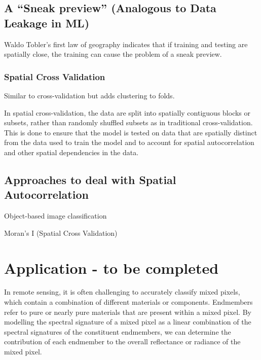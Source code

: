 \documentclass[
  letterpaper,
  DIV=11,
  numbers=noendperiod]{scrreprt}
\begin{document}
\hypertarget{a-sneak-preview-analogous-to-data-leakage-in-ml}{%
\subsection{A ``Sneak preview'' (Analogous to Data Leakage in
ML)}\label{a-sneak-preview-analogous-to-data-leakage-in-ml}}

Waldo Tobler's first law of geography indicates that if training and
testing are spatially close, the training can cause the problem of a
sneak preview.

\hypertarget{spatial-cross-validation}{%
\subsubsection{Spatial Cross
Validation}\label{spatial-cross-validation}}

Similar to cross-validation but adds clustering to folds.

In spatial cross-validation, the data are split into spatially
contiguous blocks or subsets, rather than randomly shuffled subsets as
in traditional cross-validation. This is done to ensure that the model
is tested on data that are spatially distinct from the data used to
train the model and to account for spatial autocorrelation and other
spatial dependencies in the data.

\hypertarget{approaches-to-deal-with-spatial-autocorrelation}{%
\subsection{Approaches to deal with Spatial
Autocorrelation}\label{approaches-to-deal-with-spatial-autocorrelation}}

Object-based image classification

Moran's I (Spatial Cross Validation)

\hypertarget{application---to-be-completed}{%
\section{Application - to be
completed}\label{application---to-be-completed}}

In remote sensing, it is often challenging to accurately classify mixed
pixels, which contain a combination of different materials or
components. Endmembers refer to pure or nearly pure materials that are
present within a mixed pixel. By modelling the spectral signature of a
mixed pixel as a linear combination of the spectral signatures of the
constituent endmembers, we can determine the contribution of each
endmember to the overall reflectance or radiance of the mixed pixel.
\end{document}
